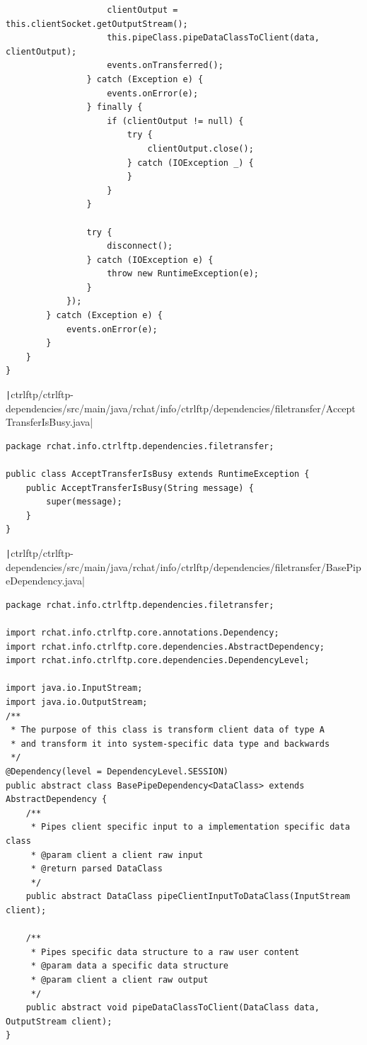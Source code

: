 \documentclass[a4paper,14pt]{extarticle}
\begin{document}
\begin{verbatim}
                    clientOutput = this.clientSocket.getOutputStream();
                    this.pipeClass.pipeDataClassToClient(data, clientOutput);
                    events.onTransferred();
                } catch (Exception e) {
                    events.onError(e);
                } finally {
                    if (clientOutput != null) {
                        try {
                            clientOutput.close();
                        } catch (IOException _) {
                        }
                    }
                }

                try {
                    disconnect();
                } catch (IOException e) {
                    throw new RuntimeException(e);
                }
            });
        } catch (Exception e) {
            events.onError(e);
        }
    }
}
\end{verbatim}
\texttt|ctrlftp/ctrlftp-dependencies/src/main/java/rchat/info/ctrlftp/dependencies/filetransfer/AcceptTransferIsBusy.java|
\begin{verbatim}
package rchat.info.ctrlftp.dependencies.filetransfer;

public class AcceptTransferIsBusy extends RuntimeException {
    public AcceptTransferIsBusy(String message) {
        super(message);
    }
}
\end{verbatim}
\texttt|ctrlftp/ctrlftp-dependencies/src/main/java/rchat/info/ctrlftp/dependencies/filetransfer/BasePipeDependency.java|
\begin{verbatim}
package rchat.info.ctrlftp.dependencies.filetransfer;

import rchat.info.ctrlftp.core.annotations.Dependency;
import rchat.info.ctrlftp.core.dependencies.AbstractDependency;
import rchat.info.ctrlftp.core.dependencies.DependencyLevel;

import java.io.InputStream;
import java.io.OutputStream;
/**
 * The purpose of this class is transform client data of type A
 * and transform it into system-specific data type and backwards
 */
@Dependency(level = DependencyLevel.SESSION)
public abstract class BasePipeDependency<DataClass> extends AbstractDependency {
    /**
     * Pipes client specific input to a implementation specific data class
     * @param client a client raw input
     * @return parsed DataClass
     */
    public abstract DataClass pipeClientInputToDataClass(InputStream client);

    /**
     * Pipes specific data structure to a raw user content
     * @param data a specific data structure
     * @param client a client raw output
     */
    public abstract void pipeDataClassToClient(DataClass data, OutputStream client);
}
\end{verbatim}
\end{document}
